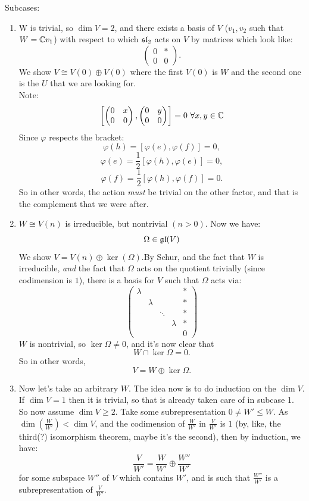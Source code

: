 \documentclass{article}
\begin{document}
Subcases: \begin{enumerate}
    \item[(1)] W is trivial, so $\dim V = 2$, and there exists a basis of $V$ ($v_{1}, v_{2}$ such that $W=\mathbb{C} v_{1}$) with respect to which $\mathfrak{sl}_{2}$ acts on $V$ by matrices which look like:
    \[ \begin{pmatrix}
        0 & * \\ 
        0 & 0
    \end{pmatrix}. \]
    We show $V \cong V(0) \oplus V(0)$ where the first $V(0)$ is $W$ and the second one is the $U$ that we are looking for.\\
    Note: \[ \left[ \begin{pmatrix}
        0 & x\\
        0 & 0
    \end{pmatrix},
    \begin{pmatrix}
        0 & y\\
        0 & 0
    \end{pmatrix} \right]=0 \, \, \forall x,y \in \mathbb{C} \] 
    Since $\varphi$ respects the bracket: \[ \varphi(h) = [\varphi(e),\varphi(f)]=0,\] \[ \varphi(e) = \frac{1}{2}[\varphi(h),\varphi(e)]=0, \] \[ \varphi(f) = \frac{1}{2}[\varphi(h), \varphi(f)]=0.\]
    So in other words, the action \textit{must} be trivial on the other factor, and that is the complement that we were after.\gap


    \item[(2)] $W \cong V(n)$ is irreducible, but nontrivial $(n > 0)$. Now we have: \[ \Omega \in \mathfrak{gl}(V)\] We show $V=V(n) \oplus \ker(\Omega)$.\gap By Schur, and the fact that $W$ is irreducible, \textit{and} the fact that $\Omega$ acts on the quotient trivially (since codimension is $1$), there is a basis for $V$ such that $\Omega$ acts via: \[
    \begin{pmatrix}
        \lambda & & & & *\\
        & \lambda & & & *\\
        & & \ddots & & *\\
        & & & \lambda & *\\
        & & & & 0
    \end{pmatrix}\]
    $W$ is nontrivial, so $\ker \Omega \neq 0$, and it's now clear that \[ W \cap \ker \Omega = 0.\] So in other words, \[ V = W \oplus \ker \Omega.\]

    \item[(3)] Now let's take an arbitrary $W$. The idea now is to do induction on the $\dim V$. If $\dim V = 1$ then it is trivial, so that is already taken care of in subcase 1. So now assume $\dim V \geq 2$. \gap Take some subrepresentation $0 \neq W' \leq W$. As $\dim \left( \frac{W}{W'} \right) < \dim V$, and the codimension of $\frac{W}{W'}$ in $\frac{V}{W'}$ is $1$ (by, like, the third(?) isomorphism theorem, maybe it's the second), then by induction, we have: \[ \frac{V}{W'} = \frac{W}{W'} \oplus \frac{W''}{W'} \tag{1} \] for some subspace $W''$ of $V$ which contains $W'$, and is such that $\frac{W''}{W'}$ is a subrepresentation of $\frac{V}{W'}$.
    

\end{enumerate}
\end{document}
